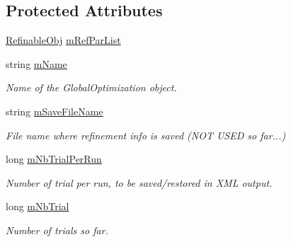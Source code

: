 \subsection*{Protected Attributes}
\begin{DoxyCompactItemize}
\item 
\mbox{\hyperlink{class_obj_cryst_1_1_refinable_obj}{Refinable\+Obj}} \mbox{\hyperlink{class_obj_cryst_1_1_optimization_obj_a9cf13c38f24b4b2ddd6cb239286053af}{m\+Ref\+Par\+List}}
\item 
\mbox{\label{class_obj_cryst_1_1_optimization_obj_a9fa42c95df26834a9f369af61eb10ea6}} 
string \mbox{\hyperlink{class_obj_cryst_1_1_optimization_obj_a9fa42c95df26834a9f369af61eb10ea6}{m\+Name}}
\begin{DoxyCompactList}\small\item\em Name of the Global\+Optimization object. \end{DoxyCompactList}\item 
\mbox{\label{class_obj_cryst_1_1_optimization_obj_a2694dd9fc6ab088e3d79e0c9e0358311}} 
string \mbox{\hyperlink{class_obj_cryst_1_1_optimization_obj_a2694dd9fc6ab088e3d79e0c9e0358311}{m\+Save\+File\+Name}}
\begin{DoxyCompactList}\small\item\em File name where refinement info is saved (N\+OT U\+S\+ED so far...) \end{DoxyCompactList}\item 
\mbox{\label{class_obj_cryst_1_1_optimization_obj_aa48115eb35ebda38be22940f0edb7b8a}} 
long \mbox{\hyperlink{class_obj_cryst_1_1_optimization_obj_aa48115eb35ebda38be22940f0edb7b8a}{m\+Nb\+Trial\+Per\+Run}}
\begin{DoxyCompactList}\small\item\em Number of trial per run, to be saved/restored in X\+ML output. \end{DoxyCompactList}\item 
\mbox{\label{class_obj_cryst_1_1_optimization_obj_af47650ca783520dd0100077b08271c79}} 
long \mbox{\hyperlink{class_obj_cryst_1_1_optimization_obj_af47650ca783520dd0100077b08271c79}{m\+Nb\+Trial}}
\begin{DoxyCompactList}\small\item\em Number of trials so far. \end{DoxyCompactList}\item 

\end{DoxyCompactItemize}
